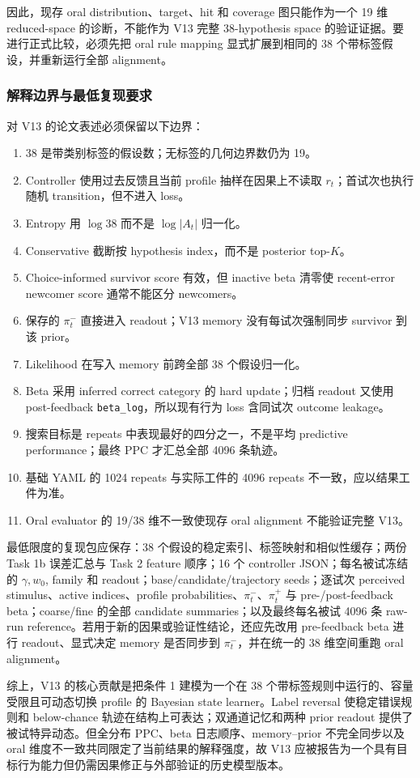 因此，现存 oral distribution、target、hit 和 coverage 图只能作为一个 19 维 reduced-space 的诊断，不能作为 V13 完整 38-hypothesis space 的验证证据。要进行正式比较，必须先把 oral rule mapping 显式扩展到相同的 38 个带标签假设，并重新运行全部 alignment。


\subsubsection{解释边界与最低复现要求}

对 V13 的论文表述必须保留以下边界：
\begin{enumerate}
    \item 38 是带类别标签的假设数；无标签的几何边界数仍为 19。
    \item Controller 使用过去反馈且当前 profile 抽样在因果上不读取 $r_t$；首试次也执行随机 transition，但不进入 loss。
    \item Entropy 用 $\log38$ 而不是 $\log|A_t|$ 归一化。
    \item Conservative 截断按 hypothesis index，而不是 posterior top-$K$。
    \item Choice-informed survivor score 有效，但 inactive beta 清零使 recent-error newcomer score 通常不能区分 newcomers。
    \item 保存的 $\pi_t^-$ 直接进入 readout；V13 memory 没有每试次强制同步 survivor 到该 prior。
    \item Likelihood 在写入 memory 前跨全部 38 个假设归一化。
    \item Beta 采用 inferred correct category 的 hard update；归档 readout 又使用 post-feedback \texttt{beta\_log}，所以现有行为 loss 含同试次 outcome leakage。
    \item 搜索目标是 repeats 中表现最好的四分之一，不是平均 predictive performance；最终 PPC 才汇总全部 4096 条轨迹。
    \item 基础 YAML 的 1024 repeats 与实际工件的 4096 repeats 不一致，应以结果工件为准。
    \item Oral evaluator 的 19/38 维不一致使现存 oral alignment 不能验证完整 V13。
\end{enumerate}

最低限度的复现包应保存：38 个假设的稳定索引、标签映射和相似性缓存；两份 Task 1b 误差汇总与 Task 2 feature 顺序；16 个 controller JSON；每名被试冻结的 $\gamma,w_0$, family 和 readout；base/candidate/trajectory seeds；逐试次 perceived stimulus、active indices、profile probabilities、$\pi_t^-$、$\pi_t^+$ 与 pre-/post-feedback beta；coarse/fine 的全部 candidate summaries；以及最终每名被试 4096 条 raw-run reference。若用于新的因果或验证性结论，还应先改用 pre-feedback beta 进行 readout、显式决定 memory 是否同步到 $\pi_t^-$，并在统一的 38 维空间重跑 oral alignment。

综上，V13 的核心贡献是把条件 1 建模为一个在 38 个带标签规则中运行的、容量受限且可动态切换 profile 的 Bayesian state learner。Label reversal 使稳定错误规则和 below-chance 轨迹在结构上可表达；双通道记忆和两种 prior readout 提供了被试特异动态。但全分布 PPC、beta 日志顺序、memory--prior 不完全同步以及 oral 维度不一致共同限定了当前结果的解释强度，故 V13 应被报告为一个具有目标行为能力但仍需因果修正与外部验证的历史模型版本。
